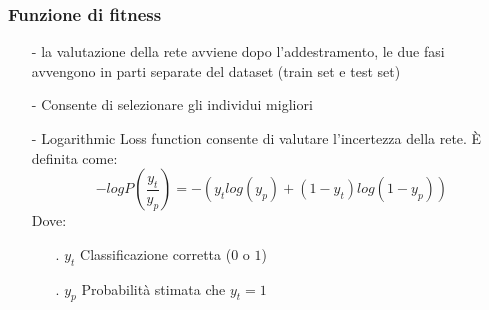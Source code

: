 \documentclass{beamer}
\begin{document}
\begin{frame}
 \frametitle{Funzione di fitness}
 \begin{enumerate}
  \item [-] la valutazione della rete avviene dopo l'addestramento, le due fasi avvengono in parti separate del dataset (train set e test set) 
  \item [-] Consente di selezionare gli individui migliori
  \item [-] Logarithmic Loss function consente di valutare l'incertezza della rete. È definita come:
 $$-log P(\frac{y_t}{y_p}) = -(y_t log(y_p) + (1-y_t)log(1-y_p))$$
 Dove:
 \begin{enumerate}
 \item[.] $y_t$ Classificazione corretta ($0$ o $1$)
 \item[.] $y_p$ Probabilità stimata che $y_t = 1$
 \end{enumerate}
 \end{enumerate}

\end{frame}
\end{document}

